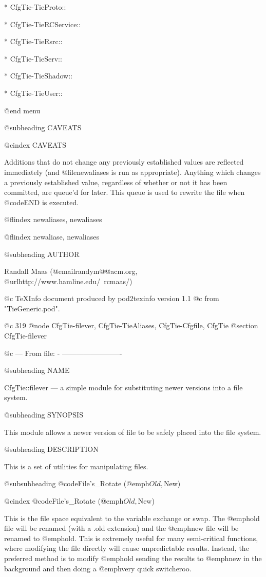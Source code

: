 * CfgTie-TieProto::	


* CfgTie-TieRCService::	
 
* CfgTie-TieRsrc::	
    
* CfgTie-TieServ::	


* CfgTie-TieShadow::	
    
* CfgTie-TieUser::	


@end menu

@subheading CAVEATS

@cindex CAVEATS

Additions that do not change any previously established values are reflected
immediately (and @file{newaliases} is run as appropriate).  Anything which changes
a previously established value, regardless of whether or not it has been
committed, are queue'd for later.  This queue is used to rewrite the file when
@code{END} is executed.

@flindex newaliases, newaliases

@flindex newaliase, newaliases

@subheading AUTHOR

Randall Maas (@email{randym@@acm.org}, @url{http://www.hamline.edu/~rcmaas/})

@c TeXInfo document produced by pod2texinfo version 1.1
@c from "TieGeneric.pod".


@c 319
@node CfgTie-filever, CfgTie-TieAliases, CfgTie-Cfgfile, CfgTie
@section CfgTie-filever


@c --- From file: - -------------------------

@subheading NAME


CfgTie::filever --- a simple module for substituting newer versions into a file system.

@subheading SYNOPSIS

This module allows a newer version of file to be safely placed into the file system.

@subheading DESCRIPTION

This is a set of utilities for manipulating files.

@subsubheading @code{File's_Rotate} (@emph{$Old, $New})

@cindex @code{File's_Rotate} (@emph{$Old, $New})

This is the file space equivalent to the variable exchange or swap.  The
@emph{old} file will be renamed (with a .old extension) and the @emph{new} file will
be renamed to @emph{old}.  This is extremely useful for many semi-critical
functions, where modifying the file directly will cause unpredictable results.
Instead, the preferred method is to modify @emph{old} sending the results to
@emph{new} in the background and then doing a @emph{very} quick switcheroo.

